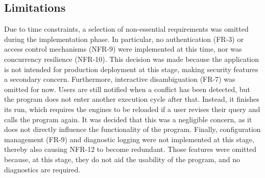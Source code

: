 



\subsection{Limitations}\label{sec:implementation_limitation}

Due to time constraints, a selection of non-essential requirements was omitted during the implementation phase. In particular, no authentication (FR-3) or access control mechanisms (NFR-9) were implemented at this time, nor was concurrency resilience (NFR-10). This decision was made because the application is not intended for production deployment at this stage, making security features a secondary concern. Furthermore, interactive disambiguation (FR-7) was omitted for now. Users are still notified when a conflict has been detected, but the program does not enter another execution cycle after that. Instead, it finishes its run, which requires the engines to be reloaded if a user revises their query and calls the program again. It was decided that this was a negligible concern, as it does not directly influence the functionality of the program. Finally, configuration management (FR-9) and diagnostic logging were not implemented at this stage, thereby also causing NFR-12 to become redundant. Those features were omitted because, at this stage, they do not aid the usability of the program, and no diagnostics are required.